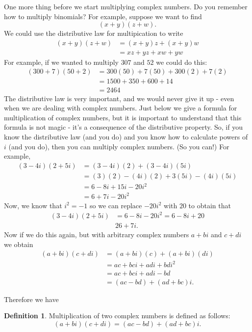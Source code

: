 \documentclass[11pt]{article}
\theoremstyle{definition}
\newtheorem{definition}[theorem]{Definition}
\begin{document}
One more thing before we start multiplying complex numbers. Do you remember how to multiply binomials? For example, suppose we want to find
\[ (x+y)(z+w).\]
We could use the distributive law for multipication to write
\begin{align*}
  (x+y)(z+w) &= (x+y)z + (x+y)w\\
             &= xz + yz + xw + yw
\end{align*}
For example, if we wanted to multiply $307$ and $52$ we could do this:
\begin{align*}
  (300+7)(50+2) &= 300(50) + 7(50) + 300(2) + 7(2)\\
                &= 1500 + 350 + 600 + 14\\
                &= 2464
\end{align*}
The distributive law is very important, and we would never give it up - even when we are dealing with complex numbers. Just below we give a formula for
multiplication of complex numbers, but it is important to understand that this formula is not magic - it's a consequence of the distributive property.
So, if you know the distributive law (and you do) and you know how to calculate powers of $i$ (and you do), then you can multiply complex numbers. (So you can!)
For example,
\begin{align*}
  (3-4i)(2+5i) &= (3-4i)(2) + (3-4i)(5i)\\
               &= (3)(2) - (4i)(2) + 3(5i)-(4i)(5i)\\
               &= 6 - 8i + 15i -20i^2\\
               &= 6 + 7i -20i^2
\end{align*}
Now, we know that $i^2= -1$ so we can replace $-20i^2$ with $20$ to obtain that
\begin{align*}
  (3-4i)(2+5i) &= 6-8i-20i^2 = 6-8i+20\\
               & 26 + 7i.
\end{align*}
Now if we do this again, but with arbitrary complex numbers $a+bi$ and $c+di$ we obtain
\begin{align*}
  (a+bi)(c+di) &= (a+bi)(c)+(a+bi)(di)\\
               &= ac + bci + adi + bdi^2\\
               &= ac + bci + adi - bd\\
             &= (ac-bd)+(ad+bc)i.
\end{align*}

Therefore we have

\begin{definition}
Multiplication of two complex numbers is defined as follows:
\[ (a+bi)(c+di) = (ac-bd) + (ad+bc)i.\]
\end{definition}
\end{document}
